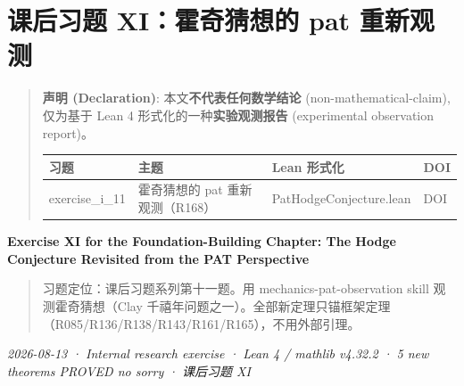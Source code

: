 \documentclass[
]{article}
\author{}
\date{}
\newcounter{none} %
\begin{document}
\section{课后习题 XI：霍奇猜想的 pat
重新观测}\label{ux7b51ux57faux7bc7ux8bfeux540eux4e60ux9898-xiux970dux5947ux731cux60f3ux7684-pat-ux91cdux65b0ux89c2ux6d4b}

\begin{quote}
\textbf{声明 (Declaration)}: 本文\textbf{不代表任何数学结论}
(non-mathematical-claim), 仅为基于 Lean 4
形式化的一种\textbf{实验观测报告} (experimental observation report)。

{\def\LTcaptype{none} %
\begin{longtable}[]{@{}
 >{\raggedright\arraybackslash}p{}
 >{\raggedright\arraybackslash}p{}
 >{\raggedright\arraybackslash}p{}
 >{\raggedright\arraybackslash}p{}@{}}
\toprule\noalign{}
\begin{minipage}[b]{\linewidth}\raggedright
习题
\end{minipage} & \begin{minipage}[b]{\linewidth}\raggedright
主题
\end{minipage} & \begin{minipage}[b]{\linewidth}\raggedright
Lean 形式化
\end{minipage} & \begin{minipage}[b]{\linewidth}\raggedright
DOI
\end{minipage} \\
\midrule\noalign{}
\endhead
\bottomrule\noalign{}
\endlastfoot
exercise\_i\_11 & 霍奇猜想的 pat 重新观测（R168） &
PatHodgeConjecture.lean & DOI \\
\end{longtable}
}
\end{quote}

\textbf{Exercise XI for the Foundation-Building Chapter: The Hodge
Conjecture Revisited from the PAT Perspective}

\begin{quote}
习题定位：课后习题系列第十一题。用 mechanics-pat-observation skill
观测霍奇猜想（Clay
千禧年问题之一）。全部新定理只锚框架定理（R085/R136/R138/R143/R161/R165），不用外部引理。
\end{quote}

\emph{2026-08-13 · Internal research exercise · Lean 4 / mathlib v4.32.2
· 5 new theorems PROVED no sorry · 课后习题 XI }
\end{document}
